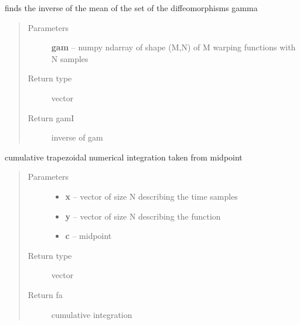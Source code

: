 \documentclass[letterpaper,10pt,english]{sphinxmanual}
\begin{document}
\begin{fulllineitems}
\label{utility_functions:utility_functions.SqrtMeanInverse}
finds the inverse of the mean of the set of the diffeomorphisms gamma
\begin{quote}\begin{description}
\item[{Parameters}] \leavevmode
\textbf{gam} -- numpy ndarray of shape (M,N) of M warping functions with N samples

\item[{Return type}] \leavevmode
vector

\item[{Return gamI}] \leavevmode
inverse of gam

\end{description}\end{quote}

\end{fulllineitems}


\begin{fulllineitems}
\label{utility_functions:utility_functions.cumtrapzmid}
cumulative trapezoidal numerical integration taken from midpoint
\begin{quote}\begin{description}
\item[{Parameters}] \leavevmode\begin{itemize}
\item {} 
\textbf{x} -- vector of size N describing the time samples

\item {} 
\textbf{y} -- vector of size N describing the function

\item {} 
\textbf{c} -- midpoint

\end{itemize}

\item[{Return type}] \leavevmode
vector

\item[{Return fa}] \leavevmode
cumulative integration

\end{description}\end{quote}

\end{fulllineitems}
\end{document}
